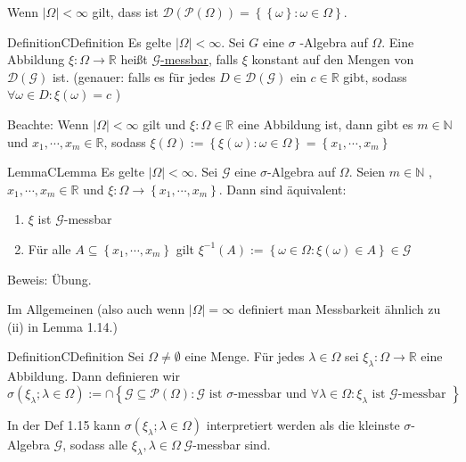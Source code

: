 \documentclass[11.5 pt, a4paper]{memoir}
\begin{document}
Wenn $ \left| \Omega  \right| < \infty $ gilt, dass ist $ \mathcal{D} ( \mathcal{P} ( \Omega )) = \left\{ \left\{ \omega  \right\}: \omega  \in \Omega  \right\} $.

\begin{ibox}[1.13]{Definition}{CDefinition}
	Es gelte  $ \left| \Omega  \right| < \infty $. Sei $ G $ eine $ \sigma $ -Algebra auf $ \Omega  $. Eine Abbildung $ \xi : \Omega  \to \mathbb{R} $ heißt \underline{$ \mathcal{G}$-messbar}, falls $ \xi $ konstant auf den Mengen von $ \mathcal{D} ( \mathcal{G}) $ ist.
	(genauer: falls es für jedes $ D \in \mathcal{D} ( \mathcal{G}) $ ein $ c \in \mathbb{R} $ gibt, sodass $ \forall \omega \in D :
	\xi (\omega) = c$ )
\end{ibox}

Beachte: Wenn  $ \left| \Omega  \right| < \infty $ gilt und $ \xi : \Omega  \in \mathbb{R} $ eine Abbildung ist, dann gibt es $ m \in
\mathbb{N}$ und $ x_1 , \cdots,  x_m \in \mathbb{R} $, sodass $ \xi (\Omega) := \left\{ \xi (\omega): \omega \in \Omega  \right\}
= \left\{ x_1 , \cdots, x_m \right\}$ 

\begin{ibox}[1.14]{Lemma}{CLemma}
    Es gelte $ \left| \Omega  \right| < \infty $. Sei $ \mathcal{G} $ eine $ \sigma $-Algebra auf $ \Omega  $. Seien $ m \in \mathbb{N} $
	, $ x_1 , \cdots, x_{m} \in \mathbb{R} $ und $ \xi : \Omega  \to \left\{ x_1 , \cdots,  x_{m} \right\} $. Dann sind äquivalent:
	\begin{enumerate}[label=\alph*)]
		\item $ \xi $ ist $ \mathcal{G} $-messbar
		\item Für alle $ A \subseteq \left\{ x_1 , \cdots,  x_m \right\} $ gilt $ \xi^{-1} (A) := \left\{ \omega \in \Omega : \xi (\omega) \in A \right\} \in \mathcal{G} $ 
	\end{enumerate}
\end{ibox}
Beweis: Übung. 

Im Allgemeinen (also auch wenn $ \left| \Omega  \right| = \infty $ definiert man Messbarkeit ähnlich zu (ii) in Lemma 1.14.) 

\begin{ibox}[1.15]{Definition}{CDefinition}
    Sei $ \Omega \neq \emptyset $ eine Menge. Für jedes $ \lambda \in \Omega  $ sei $ \xi_{\lambda}: \Omega  \to \mathbb{R} $ eine 
		Abbildung. Dann definieren wir 
		$$ \sigma \left( \xi_{\lambda} ; \lambda \in \Omega  \right) := \cap \left\{ \mathcal{G} \subseteq \mathcal{P} ( \Omega ) : 
		\mathcal{G} \text{ ist } \sigma \text{-messbar und } \forall \lambda \in \Omega : \xi_\lambda \text{ ist } \mathcal{G} \text{-messbar }   \right\} $$
\end{ibox}
In der Def 1.15 kann $ \sigma \left( \xi_\lambda ; \lambda \in \Omega  \right) $ interpretiert werden als die kleinste $ \sigma $-Algebra
$ \mathcal{G} $, sodass alle $ \xi_\lambda , \lambda \in \Omega \; \mathcal{G} $-messbar sind. 
\end{document}
